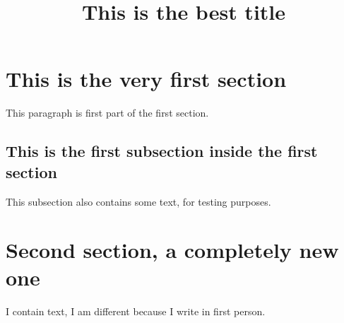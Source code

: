 \documentclass[11pt]{article}
\title{This is the best title}
\begin{document}
\maketitle
   
\section{This is the very first section}

This paragraph is first part of the first section.

\subsection{This is the first subsection inside the first section}

This subsection also contains some text, for testing purposes.

\section{Second section, a completely new one}

I contain text, I am different because I write in first person.
\end{document}
